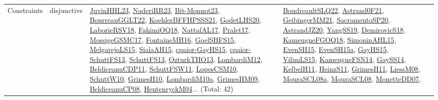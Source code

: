 {\begin{longtable}{lp{3cm}>{\raggedright}p{6cm}>{\raggedright}p{6cm}p{8cm}}
Constraints & disjunctive & \href{papers/JuvinHHL23.pdf}{JuvinHHL23}\cite{JuvinHHL23}, \href{articles/NaderiRR23.pdf}{NaderiRR23}\cite{NaderiRR23}, \href{papers/Bit-Monnot23.pdf}{Bit-Monnot23}\cite{Bit-Monnot23}, \href{articles/BourreauGGLT22.pdf}{BourreauGGLT22}\cite{BourreauGGLT22}, \href{articles/KoehlerBFFHPSSS21.pdf}{KoehlerBFFHPSSS21}\cite{KoehlerBFFHPSSS21}, \href{papers/GodetLHS20.pdf}{GodetLHS20}\cite{GodetLHS20}, \href{articles/LaborieRSV18.pdf}{LaborieRSV18}\cite{LaborieRSV18}, \href{articles/FahimiOQ18.pdf}{FahimiOQ18}\cite{FahimiOQ18}, \href{articles/NattafAL17.pdf}{NattafAL17}\cite{NattafAL17}, \href{papers/Pralet17.pdf}{Pralet17}\cite{Pralet17}, \href{papers/MossigeGSMC17.pdf}{MossigeGSMC17}\cite{MossigeGSMC17}, \href{papers/FontaineMH16.pdf}{FontaineMH16}\cite{FontaineMH16}, \href{articles/GoelSHFS15.pdf}{GoelSHFS15}\cite{GoelSHFS15}, \href{papers/MelgarejoLS15.pdf}{MelgarejoLS15}\cite{MelgarejoLS15}, \href{papers/SialaAH15.pdf}{SialaAH15}\cite{SialaAH15}, \href{papers/cpaior-GayHS15.pdf}{cpaior-GayHS15}\cite{cpaior-GayHS15}, \href{papers/cpaior-SchuttFS13.pdf}{cpaior-SchuttFS13}\cite{cpaior-SchuttFS13}, \href{papers/SchuttFS13.pdf}{SchuttFS13}\cite{SchuttFS13}, \href{articles/OzturkTHO13.pdf}{OzturkTHO13}\cite{OzturkTHO13}, \href{articles/LombardiM12.pdf}{LombardiM12}\cite{LombardiM12}, \href{articles/BeldiceanuCDP11.pdf}{BeldiceanuCDP11}\cite{BeldiceanuCDP11}, \href{articles/SchuttFSW11.pdf}{SchuttFSW11}\cite{SchuttFSW11}, \href{articles/LopesCSM10.pdf}{LopesCSM10}\cite{LopesCSM10}, \href{papers/SchuttW10.pdf}{SchuttW10}\cite{SchuttW10}, \href{papers/GrimesH10.pdf}{GrimesH10}\cite{GrimesH10}, \href{articles/LombardiM10a.pdf}{LombardiM10a}\cite{LombardiM10a}, \href{papers/GrimesHM09.pdf}{GrimesHM09}\cite{GrimesHM09}, \href{papers/BeldiceanuCP08.pdf}{BeldiceanuCP08}\cite{BeldiceanuCP08}, \href{papers/HentenryckM04.pdf}{HentenryckM04}\cite{HentenryckM04}... (Total: 42) & \href{papers/BoudreaultSLQ22.pdf}{BoudreaultSLQ22}\cite{BoudreaultSLQ22}, \href{papers/Astrand0F21.pdf}{Astrand0F21}\cite{Astrand0F21}, \href{papers/GeibingerMM21.pdf}{GeibingerMM21}\cite{GeibingerMM21}, \href{articles/SacramentoSP20.pdf}{SacramentoSP20}\cite{SacramentoSP20}, \href{articles/AstrandJZ20.pdf}{AstrandJZ20}\cite{AstrandJZ20}, \href{papers/YangSS19.pdf}{YangSS19}\cite{YangSS19}, \href{papers/DemirovicS18.pdf}{DemirovicS18}\cite{DemirovicS18}, \href{papers/KameugneFGOQ18.pdf}{KameugneFGOQ18}\cite{KameugneFGOQ18}, \href{articles/SimoninAHL15.pdf}{SimoninAHL15}\cite{SimoninAHL15}, \href{papers/EvenSH15.pdf}{EvenSH15}\cite{EvenSH15}, \href{articles/EvenSH15a.pdf}{EvenSH15a}\cite{EvenSH15a}, \href{papers/GayHS15.pdf}{GayHS15}\cite{GayHS15}, \href{papers/VilimLS15.pdf}{VilimLS15}\cite{VilimLS15}, \href{articles/KameugneFSN14.pdf}{KameugneFSN14}\cite{KameugneFSN14}, \href{papers/GaySS14.pdf}{GaySS14}\cite{GaySS14}, \href{articles/KelbelH11.pdf}{KelbelH11}\cite{KelbelH11}, \href{papers/HeinzS11.pdf}{HeinzS11}\cite{HeinzS11}, \href{papers/GrimesH11.pdf}{GrimesH11}\cite{GrimesH11}, \href{articles/LiessM08.pdf}{LiessM08}\cite{LiessM08}, \href{papers/MouraSCL08a.pdf}{MouraSCL08a}\cite{MouraSCL08a}, \href{papers/MouraSCL08.pdf}{MouraSCL08}\cite{MouraSCL08}, \href{papers/MonetteDD07.pdf}{MonetteDD07}\cite{MonetteDD07}, 
\end{longtable}}
